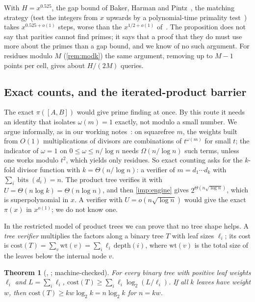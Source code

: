 \documentclass[10pt]{amsart}
\theoremstyle{plain}
\newtheorem{theorem}{Theorem}[section]
\theoremstyle{definition}
\theoremstyle{remark}
\numberwithin{equation}{section}
\begin{document}
\noindent With $H=x^{0.525}$, the gap bound of Baker, Harman and Pintz~\cite{BHP01}, the matching
strategy (test the integers from $x$ upwards by a polynomial-time primality test~\cite{AKS04}) takes
$x^{0.525+o(1)}$ steps, worse than the $x^{1/2+o(1)}$ of~\cite{LO87}. The proposition does not say that
parities cannot find primes; it says that a proof that they do must use more about the primes than a
gap bound, and we know of no such argument. For residues modulo $M$ (\cref{rem:modk}) the same
argument, removing up to $M-1$ points per cell, gives about $H/(2M)$ queries.

\subsection{Exact counts, and the iterated-product barrier}\label{sec:barrier}
The exact $\pi([A,B])$ would give prime finding at once. By this route it needs an identity that isolates
$\omega(m)=1$ exactly, not modulo a small number. We argue informally, as in our working
notes~\cite[\texttt{research/prime-finding.md}, \S4]{TulsyanRepo26}: on squarefree $m$, the weights
built from $O(1)$ multiplications of divisors are combinations of $t^{\omega(m)}$ for small $t$; the
indicator of $\omega=1$ on $0\le\omega\le n/\log n$ needs $\Omega(n/\log n)$ such terms, unless one works
modulo $t^2$, which yields only residues. So exact counting asks for the $k$-fold divisor function with
$k=\Theta(n/\log n)$: a verifier of $m=d_1\cdots d_k$ with $\sum_i\operatorname{bits}(d_i)=n$. The product
tree verifies it with $U=\Theta(n\log k)=\Theta(n\log n)$, and then \cref{imp:engine} gives
$2^{\Theta(n\sqrt{\log n})}$, which is superpolynomial in $x$. A verifier with $U=o(n\sqrt{\log n})$ would
give the exact $\pi(x)$ in $x^{o(1)}$; we do not know one.

In the restricted model of product trees we can prove that no tree shape helps. A \emph{tree verifier}
multiplies the factors along a binary tree $T$ with leaf sizes $\ell_i$; its cost is
$\mathrm{cost}(T)=\sum_{v}\mathrm{wt}(v)=\sum_i\ell_i\,\mathrm{depth}(i)$, where $\mathrm{wt}(v)$ is the
total size of the leaves below the internal node $v$.

\begin{theorem}[, ; machine-checked]\label{thm:tree}
For every binary tree with positive leaf weights $\ell_i$ and $L=\sum_i\ell_i$,
$\mathrm{cost}(T)\ge\sum_i\ell_i\log_2(L/\ell_i)$. If all $k$ leaves have weight $w$, then
$\mathrm{cost}(T)\ge kw\log_2k=n\log_2k$ for $n=kw$.
\end{theorem}
\end{document}
